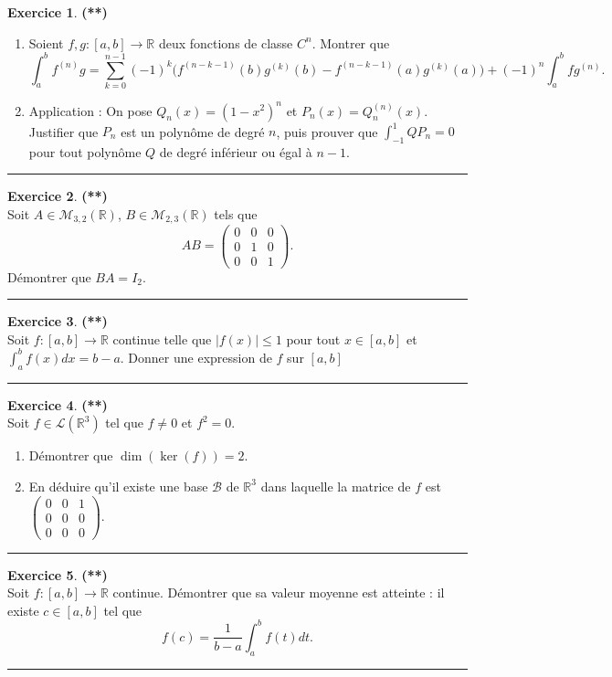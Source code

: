 \documentclass[a4paper,11pt]{article}
\theoremstyle{definition}
\newtheorem{exo}{Exercice} %
\begin{document}
\begin{exo}\textbf{(**)}\quad\\[0.25cm]
\begin{enumerate}
	\item Soient $f,g:[a,b]\to\mathbb R$ deux fonctions de classe $C^n$. Montrer que
	$$\int_{a}^b f^{(n)}g=\sum_{k=0}^{n-1}(-1)^k \big(f^{(n-k-1)}(b)g^{(k)}(b)-f^{(n-k-1)}(a)g^{(k)}(a)\big)+(-1)^n \int_a^b fg^{(n)}.$$
	\item Application : On pose $Q_n(x)=(1-x^2)^n$ et $P_n(x)=Q_n^{(n)}(x)$. Justifier que $P_n$ est un polynôme de degré $n$, puis prouver
	que $\int_{-1}^1 QP_n=0$ pour tout polynôme $Q$ de degré inférieur ou égal à $n-1$.
\end{enumerate}	
	\centering
	\rule{1\linewidth}{0.6pt}
\end{exo}

	


\begin{exo}\textbf{(**)}\quad\\[0.25cm]%
Soit $A\in\mathcal M_{3,2}(\mathbb R)$, $B\in\mathcal M_{2,3}(\mathbb R)$ tels que 
$$AB=\left(
\begin{array}{ccc}
0&0&0\\
0&1&0\\
0&0&1
\end{array}
\right).$$
Démontrer que $BA=I_2$.
	\centering
\rule{1\linewidth}{0.6pt}
\end{exo}

\begin{exo}\textbf{(**)}\quad\\[0.25cm]%
Soit $f:[a,b]\to\mathbb R$ continue telle que $|f(x)|\leq 1$ pour tout $x\in[a,b]$
et $\int_a^b f(x)dx=b-a$. Donner une expression de $f$ sur $[a,b]$
	
	\centering
	\rule{1\linewidth}{0.6pt}
\end{exo}

\newpage

\begin{exo}\textbf{(**)}\quad\\[0.25cm]%
Soit $f\in\mathcal L(\mathbb R^3)$ tel que $f\neq 0$ et $f^2=0$.
\begin{enumerate}
	\item Démontrer que $\dim(\ker(f))=2$.
	\item En déduire qu'il existe une base $\mathcal B$ de $\mathbb R^3$ dans laquelle la matrice de $f$ est $\begin{pmatrix}0&0&1\\0&0&0\\0&0&0\end{pmatrix}$. 
\end{enumerate}	
	\centering
	\rule{1\linewidth}{0.6pt}
\end{exo}




\begin{exo}\textbf{(**)}\quad\\[0.25cm]%
Soit $f:[a,b]\to\mathbb R$ continue. Démontrer que sa valeur moyenne est atteinte : il existe $c\in [a,b]$ tel que 
$$f(c)=\frac{1}{b-a}\int_a^b f(t)dt.$$	
	
	\centering
	\rule{1\linewidth}{0.6pt}
\end{exo}
\end{document}
